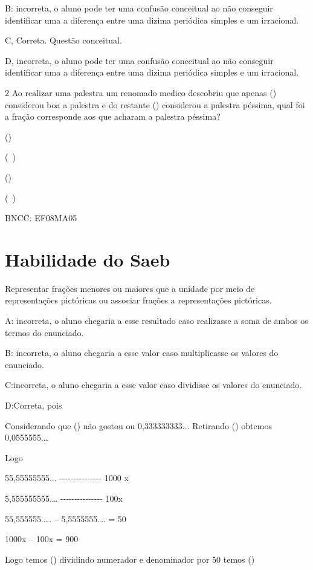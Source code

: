 B: incorreta, o aluno pode ter uma confusão conceitual ao não conseguir
identificar uma a diferença entre uma dizima periódica simples e um
irracional.

C, Correta. Questão conceitual.

D, incorreta, o aluno pode ter uma confusão conceitual ao não conseguir
identificar uma a diferença entre uma dizima periódica simples e um
irracional.

\num{2} Ao realizar uma palestra um renomado medico descobriu que apenas
() considerou boa a palestra e do restante ()
considerou a palestra péssima, qual foi a fração corresponde aos que
acharam a palestra péssima?

\item ()
\item (\ )
\item ()
\item (\ )

BNCC: EF08MA05

\section{Habilidade do Saeb} Representar frações menores ou maiores que a unidade
por meio de representações pictóricas ou associar frações a
representações pictóricas.

A: incorreta, o aluno chegaria a esse resultado caso realizasse a soma
de ambos os termos do enunciado.

B: incorreta, o aluno chegaria a esse valor caso multiplicasse os
valores do enunciado.

C:incorreta, o aluno chegaria a esse valor caso dividisse os valores do
enunciado.

D:Correta, pois

Considerando que () não gostou ou 0,333333333... Retirando
() obtemos 0,0555555.\ldots{}

Logo

55,55555555... -\/-\/-\/-\/-\/-\/-\/-\/-\/-\/-\/-\/-\/-\/- 1000 x

5,555555555.\ldots{} -\/-\/-\/-\/-\/-\/-\/-\/-\/-\/-\/-\/-\/-\/- 100x

55,555555.\ldots. -- 5,5555555.\ldots{} = 50

1000x -- 100x = 900

Logo temos () dividindo numerador e denominador por 50
temos ()

